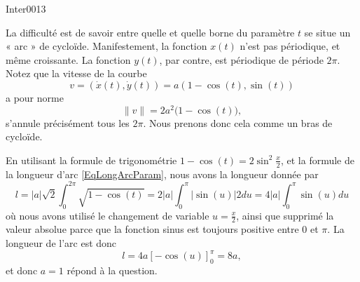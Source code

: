 \begin{corrige}{Inter0013}

La difficulté est de savoir entre quelle et quelle borne du paramètre $t$ se situe un « arc » de cycloïde. Manifestement, la fonction $x(t)$ n'est pas périodique, et même croissante. La fonction $y(t)$, par contre, est périodique de période $2\pi$. Notez que la vitesse de la courbe
\begin{equation}
	v=( \dot x(t),\dot y(t) )=a(1-\cos(t),\sin(t))
\end{equation}
a pour norme
\begin{equation}
	\| v \|=2a^2\big( 1-\cos(t) \big),
\end{equation}
s'annule précisément tous les $2\pi$. Nous prenons donc cela comme un bras de cycloïde.

%

En utilisant la formule de trigonométrie $1-\cos(t)=2\sin^2\frac{ x }{ 2 }$, et la formule de la longueur d'arc \eqref{EqLongArcParam}, nous avons la longueur donnée par
\begin{equation}
	l=| a |\sqrt{2}\int_0^{2\pi}\sqrt{1-\cos(t)}=2| a |\int_0^{\pi}|\sin(u)|2 du=4| a |\int_0^{\pi}\sin(u) du
\end{equation}
où nous avons utilisé le changement de variable $u=\frac{ x }{ 2 }$, ainsi que supprimé la valeur absolue parce que la fonction sinus est toujours positive entre $0$ et $\pi$. La longueur de l'arc est donc
\begin{equation}
	l=4a\left[ -\cos(u) \right]_0^{\pi}=8a,
\end{equation}
et donc $a=1$ répond à la question.

\end{corrige}
